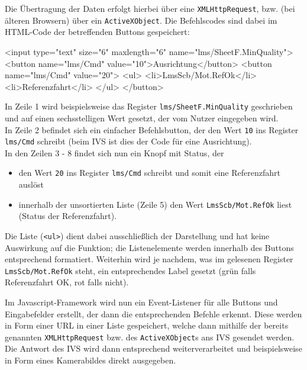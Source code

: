 \documentclass[xcolor=dvipsnames,11pt,paper=a4paper]{report}
\begin{document}
Die Übertragung der Daten erfolgt hierbei über eine \texttt{XMLHttpRequest}, bzw.
(bei älteren Browsern) über ein \texttt{ActiveXObject}. Die Befehlscodes sind dabei
im HTML-Code der betreffenden Buttons gespeichert:

\begin{code}[language=html, caption={Ins HTML eingebettete Befehle für das IVS}, label={lst:ivs-html-befehle}]
<input type="text" size="6" maxlength="6" name="lms/SheetF.MinQuality">
<button name="lms/Cmd" value="10">Ausrichtung</button>
<button name="lms/Cmd" value="20">
	<ul>
		<li>LmsScb/Mot.RefOk</li>
		<li>Referenzfahrt</li>
	</ul>
</button>
\end{code}

In Zeile 1 wird beispielsweise das Register \texttt{lms/SheetF.MinQuality} geschrieben
und auf einen sechsstelligen Wert gesetzt, der vom Nutzer eingegeben wird.\\
In Zeile 2 befindet sich ein einfacher Befehlsbutton, der den Wert \texttt{10} ins
Register \texttt{lms/Cmd} schreibt (beim IVS ist dies der Code für eine Ausrichtung).\\
In den Zeilen 3 - 8 findet sich nun ein Knopf mit Status, der
\begin{itemize}
	\item den Wert \texttt{20} ins Register \texttt{lms/Cmd} schreibt und somit eine
	Referenzfahrt auslöst
	\item innerhalb der unsortierten Liste (Zeile 5) den Wert \texttt{LmsScb/Mot.RefOk}
	liest (Status der Referenzfahrt).
\end{itemize}
Die Liste (\texttt{<ul>}) dient dabei ausschließlich der Darstellung und hat keine
Auswirkung auf die Funktion; die Listenelemente werden innerhalb des Buttons entsprechend
formatiert. Weiterhin wird je nachdem, was im gelesenen Register \texttt{LmsScb/Mot.RefOk}
steht, ein entsprechendes Label gesetzt (grün falls Referenzfahrt OK, rot falls
nicht).

Im Javascript-Framework wird nun ein Event-Listener für alle Buttons und Eingabefelder
erstellt, der dann die entsprechenden Befehle erkennt. Diese werden in Form einer
URL in einer Liste gespeichert, welche dann mithilfe der bereits genannten \texttt{XMLHttpRequest}
bzw. des \texttt{ActiveXObject}s ans IVS gesendet werden. Die Antwort des IVS wird
dann entsprechend weiterverarbeitet und beispielsweise in Form eines Kamerabildes
direkt ausgegeben.




\end{document}
